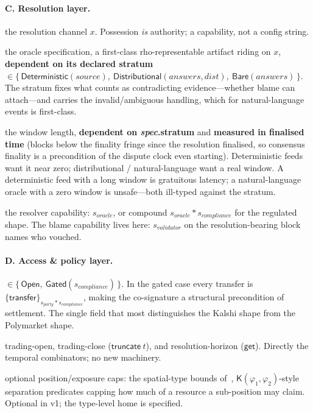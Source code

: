\documentclass[11pt]{article}
\newcommand{\Kcut}{\mathsf{K}}
\newcommand{\sep}{\mathbin{\ast}}
\begin{document}
\paragraph{C. Resolution layer.}
\begin{description}[leftmargin=1.4em,itemsep=0.2em]
\item[\textit{oracle}] the resolution channel $x$. Possession \emph{is} authority; a
capability, not a config string.
\item[\textit{spec}] the oracle specification, a first-class rho-representable artifact riding
on $x$, \textbf{dependent on its declared stratum} $\in \{\,\mathsf{Deterministic}(\mathit{source}),\
\mathsf{Distributional}(\mathit{answers},\mathit{dist}),\ \mathsf{Bare}(\mathit{answers})\,\}$.
The stratum fixes what counts as contradicting evidence---whether blame can attach---and
carries the invalid/ambiguous handling, which for natural-language events is first-class.
\item[\textit{dispute}] the window length, \textbf{dependent on \textit{spec}.stratum} and
\textbf{measured in finalised time} (blocks below the finality fringe since the resolution
finalised, so consensus finality is a precondition of the dispute clock even starting).
Deterministic feeds want it near zero; distributional / natural-language want a real window. A
deterministic feed with a long window is gratuitous latency; a natural-language oracle with a
zero window is unsafe---both ill-typed against the stratum.
\item[\textit{authority}] the resolver capability: $s_{\mathit{oracle}}$, or compound
$s_{\mathit{oracle}} \sep s_{\mathit{compliance}}$ for the regulated shape. The blame
capability lives here: $s_{\mathit{validator}}$ on the resolution-bearing block names who
vouched.
\end{description}

\paragraph{D. Access \& policy layer.}
\begin{description}[leftmargin=1.4em,itemsep=0.2em]
\item[\textit{compliance}] $\in \{\,\mathsf{Open},\ \mathsf{Gated}(s_{\mathit{compliance}})\,\}$.
In the gated case every transfer is
$\{\mathsf{transfer}\}_{s_{\mathit{party}}\sep s_{\mathit{compliance}}}$, making the
co-signature a structural precondition of settlement. The single field that most distinguishes
the Kalshi shape from the Polymarket shape.
\item[\textit{schedule}] trading-open, trading-close ($\textsf{truncate}\ t$), and
resolution-horizon ($\textsf{get}$). Directly the temporal combinators; no new machinery.
\item[\textit{limits}] optional position/exposure caps: the spatial-type bounds
of~\cite[\S8]{finrho}, $\Kcut(\varphi_1,\varphi_2)$-style separation predicates capping how
much of a resource a sub-position may claim. Optional in v1; the type-level home is specified.
\end{description}
\end{document}
